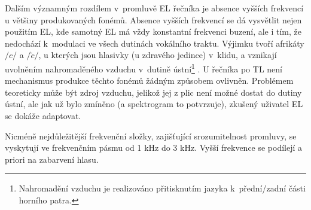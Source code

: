 Dalším významným rozdílem v~promluvě EL řečníka je absence vyšších frekvencí u většiny produkovaných fonémů.
Absence vyšších frekvencí se dá vysvětlit nejen použitím EL, kde samotný EL má vždy konstantní frekvenci buzení, ale i tím, že nedochází  k~modulaci ve všech dutinách vokálního traktu.
Výjimku tvoří afrikáty $/c/$ a $/\check{c}/$, u kterých jsou hlasivky (u zdravého jedince) v~klidu, a vznikají uvolněním nahromaděného vzduchu v~dutině ústní\footnote{Nahromadění vzduchu je realizováno přitisknutím jazyka  k~přední/zadní části horního patra.} \cite{Psutka2006}.
U řečníka po TL není mechanismus produkce těchto fonémů žádným způsobem ovlivněn.
Problémem teoreticky může být zdroj vzduchu, jelikož jej z plic není možné dostat do dutiny ústní, ale jak už bylo zmíněno (a spektrogram to potvrzuje), zkušený uživatel EL se dokáže adaptovat.

 Nicméně nejdůležitější frekvenční složky, zajišťující srozumitelnost promluvy, se vyskytují ve frekvenčním pásmu od 1 kHz do 3 kHz.
 Vyšší frekvence se podílejí a priori na zabarvení hlasu.

